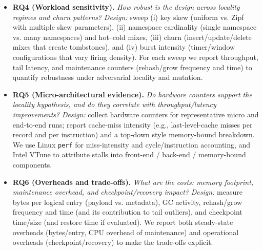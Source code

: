 \documentclass[sigconf]{acmart}
\begin{document}
\begin{itemize}
  \item \textbf{RQ4 (Workload sensitivity).} \emph{How robust is the design across locality regimes and churn patterns?}
  \emph{Design:} sweep (i) key skew (uniform vs. Zipf with multiple skew parameters), (ii) namespace cardinality (single namespace vs. many namespaces) and hot--cold mixes, (iii) churn (insert/update/delete mixes that create tombstones), and (iv) burst intensity (timer/window configurations that vary firing density). For each sweep we report throughput, tail latency, and maintenance counters (rehash/grow frequency and time) to quantify robustness under adversarial locality and mutation.

  \item \textbf{RQ5 (Micro-architectural evidence).} \emph{Do hardware counters support the locality hypothesis, and do they correlate with throughput/latency improvements?}
  \emph{Design:} collect hardware counters for representative micro and end-to-end runs; report cache-miss intensity (e.g., last-level-cache misses per record and per instruction) and a top-down style memory-bound breakdown. We use Linux \texttt{perf} for miss-intensity and cycle/instruction accounting, and Intel VTune to attribute stalls into front-end / back-end / memory-bound components.

  \item \textbf{RQ6 (Overheads and trade-offs).} \emph{What are the costs: memory footprint, maintenance overhead, and checkpoint/recovery impact?}
  \emph{Design:} measure bytes per logical entry (payload vs. metadata), GC activity, rehash/grow frequency and time (and its contribution to tail outliers), and checkpoint time/size (and restore time if evaluated). We report both steady-state overheads (bytes/entry, CPU overhead of maintenance) and operational overheads (checkpoint/recovery) to make the trade-offs explicit.
\end{itemize}
\end{document}
